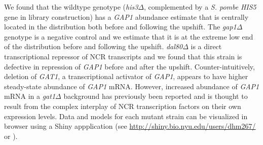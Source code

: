 
We found that the wildtype
genotype (\textit{his3}$\Delta$, complemented by a \textit{S. pombe} 
\textit{HIS5} gene in library construction) 
has a \textit{GAP1} abundance estimate that is centrally
located in the distribution both before and following the upshift. The
\textit{gap1}$\Delta$ genotype is a negative control and 
we estimate that it is at the extreme
low end of the distribution before and following the upshift. 
\textit{dal80}$\Delta$ is a direct transcriptional repressor
of NCR transcripts %
and we found that this strain is defective in
repression of \textit{GAP1} before and after the upshift. 
Counter-intuitively, deletion of \textit{GAT1}, a transcriptional activator
of \textit{GAP1}, appears to have higher steady-state abundance of
\textit{GAP1} mRNA.
However, increased abundance of \textit{GAP1} mRNA in a
\textit{gat1}$\Delta$ background has
previously been reported \parencite{scherens2006identification} and is thought to
result from the complex interplay of NCR transcription factors on
their own expression levels. 
Data and models for each mutant strain can be visualized in browser
using a Shiny appplication (see
\url{http://shiny.bio.nyu.edu/users/dhm267/} or ). 




